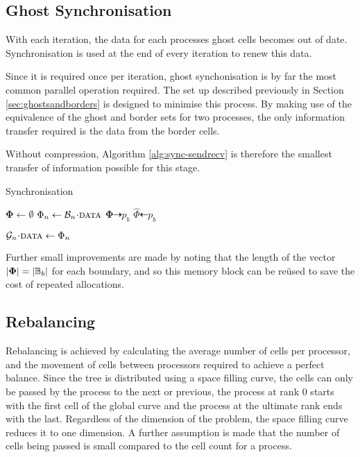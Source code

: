 \documentclass{IIBproject}
\newcommand{\vect}[1]{\bm{#1}}
\newcommand{\dra}{\dashrightarrow}
\newcommand{\dla}{\dashleftarrow}
\newcommand{\acc}{{\mkern 0.5mu\cdot\mkern 0.5mu}}
\begin{document}
\subsection{Ghost Synchronisation}

With each iteration, the data for each processes ghost cells becomes out of date. Synchronisation is used at the end of every iteration to renew this data. 

Since it is required once per iteration, ghost synchonisation is by far the most common parallel operation required. The set up described previously in Section \ref{sec:ghostsandborders} is designed to minimise this process. By making use of the equivalence of the ghost and border sets for two processes, the only information transfer required is the data from the border cells.

Without compression, Algorithm \ref{alg:sync-sendrecv} is therefore the smallest transfer of information possible for this stage.

\begin{algorithm}[H]
\caption{Synchronisation}
\label{alg:sync-sendrecv}

\begin{algorithmic}
	\State $\vect{\Phi} \gets \emptyset$
		\State $\Phi_n \gets \mathcal{B}_n\acc\textproc{data}$
	\EndFor
	\Send $\vect{\Phi} \dra p_b$
\EndFor
\Statex
{}
	\Recv $\hat \Phi \dla p_b$

		\State $\mathcal{G}_n\acc\textproc{data} \gets \Phi_n$
	\EndFor
\EndFor
\end{algorithmic}
\end{algorithm}

Further small improvements are made by noting that the length of the vector $\abs{\vect{\Phi}} = \abs{\mathbb{B}_b}$ for each boundary, and so this memory block can be re\"used to save the cost of repeated allocations. 

\subsection{Rebalancing}

Rebalancing is achieved by calculating the average number of cells per processor, and the movement of cells between processors required to achieve a perfect balance. Since the tree is distributed using a space filling curve, the cells can only be passed by the process to the next or previous, the process at rank 0 starts with the first cell of the global curve and the process at the ultimate rank ends with the last. Regardless of the dimension of the problem, the space filling curve reduces it to one dimension. A further assumption is made that the number of cells being passed is small compared to the cell count for a process.
\end{document}
